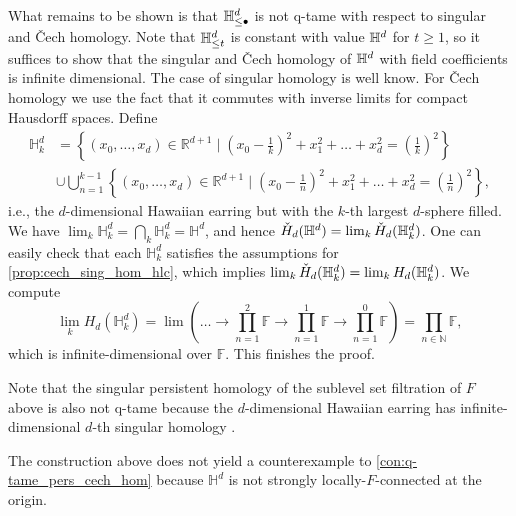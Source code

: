What remains to be shown is that $\mathbb{H}^d_{\leq \bullet}$ is not q-tame with respect to singular and \v{C}ech homology.
Note that $\mathbb{H}^d_{\leq t}$ is constant with value $\mathbb{H}^d$ for $t \geq 1$, so it suffices to show that the singular and \v{C}ech homology of $\mathbb{H}^d$ with field coefficients is infinite dimensional.
The case of singular homology is well know.
For \v{C}ech homology we use the fact that it commutes with inverse limits for compact Hausdorff spaces.
Define 
\begin{align*}
\mathbb{H}^{d}_k&=\left\{(x_0,\dots,x_d)\in\mathbb{R}^{d+1}\mid \left(x_0-\frac{1}{k}\right)^2+x_1^2+\dots+x_d^2=\left(\frac{1}{k}\right)^2\right\}\\
&\cup\bigcup_{n=1}^{k-1}\left\{(x_0,\dots,x_d)\in\mathbb{R}^{d+1}\mid \left(x_0-\frac{1}{n}\right)^2+x_1^2+\dots+x_d^2=\left(\frac{1}{n}\right)^2\right\},
\end{align*}
i.e., the $d$-dimensional Hawaiian earring but with the $k$-th largest $d$-sphere filled.
We have $\lim_{k}\mathbb{H}^{d}_{k}=\bigcap_{k}\mathbb{H}^{d}_{k}=\mathbb{H}^{d}$, and hence $\check{H}_{d}(\mathbb{H}^{d}) = \lim_{k}\check{H}_{d}(\mathbb{H}^{d}_{k})$.
One can easily check that each $\mathbb{H}^{d}_{k}$ satisfies the assumptions for \cref{prop:cech_sing_hom_hlc}, which implies $\lim_{k}\check{H}_{d}(\mathbb{H}^{d}_{k})=\lim_{k}H_{d}(\mathbb{H}^{d}_{k})$.
We compute
\[
\lim_{k}H_{d}(\mathbb{H}^{d}_{k})=\lim\left(\dots\to \prod_{n=1}^2\mathbb{F}\to \prod_{n=1}^1\mathbb{F}\to \prod_{n=1}^0\mathbb{F}\right)=\prod_{n\in\mathbb{N}}\mathbb{F},
\]
which is infinite-dimensional over $\mathbb{F}$.
This finishes the proof.

\begin{rem}
Note that the singular persistent homology of the sublevel set filtration of $F$ above is also not q-tame because the $d$-dimensional Hawaiian earring has infinite-dimensional $d$-th singular homology \cite{Barratt.1962}. 
\end{rem}

\begin{rem}
The construction above does not yield a counterexample to \cref{con:q-tame_pers_cech_hom} because $\mathbb{H}^{d}$ is not strongly locally-$F$-connected at the origin.
\end{rem}